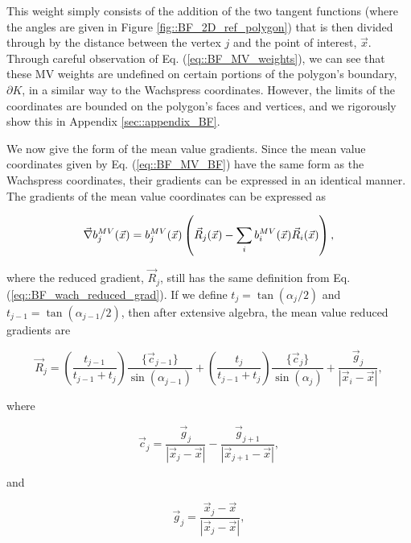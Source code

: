 \noindent This weight simply consists of the addition of the two tangent functions (where the angles are given in Figure \ref{fig::BF_2D_ref_polygon}) that is then divided through by the distance between the vertex $j$ and the point of interest, $\vec{x}$. Through careful observation of Eq. (\ref{eq::BF_MV_weights}), we can see that these MV weights are undefined on certain portions of the polygon's boundary, $\partial K$, in a similar way to the Wachspress coordinates. However, the limits of the coordinates are bounded on the polygon's faces and vertices, and we rigorously show this in Appendix \ref{sec::appendix_BF}.

We now give the form of the mean value gradients. Since the mean value coordinates given by Eq. (\ref{eq::BF_MV_BF}) have the same form as the Wachspress coordinates, their gradients can be expressed in an identical manner. The gradients of the mean value coordinates can be expressed as

\begin{equation}
\label{eq::BF_mv_gradient}
\vec{\nabla} b_{j}^{MV}(\vec{x}) = b_{j}^{MV} (\vec{x}) \left( \vec{R}_j  (\vec{x})- \sum\displaylimits_{i}   b_{i}^{MV} (\vec{x}) \vec{R}_i (\vec{x}) \right) ,
\end{equation}

\noindent where the reduced gradient, $\vec{R}_j $, still has the same definition from Eq. (\ref{eq::BF_wach_reduced_grad}). If we define $t_j=\tan(\alpha_j/2)$ and $t_{j-1}=\tan(\alpha_{j-1}/2)$, then after extensive algebra, the mean value reduced gradients are

\begin{equation}
\label{eq::BF_mv_red_grad_form}
\vec{R}_j  = \left( \frac{t_{j-1}}{t_{j-1} + t_{j}} \right) \frac{\{  \vec{c}_{j-1} \}}{\sin (  \alpha_{j-1} )} +  \left( \frac{t_{j}}{t_{j-1} + t_{j}} \right) \frac{\{  \vec{c}_{j} \}}{\sin (  \alpha_{j} )}+ \frac{\vec{g}_j}{|\vec{x}_i - \vec{x}|},
\end{equation}

\noindent where

\begin{equation}
\label{eq::BF_mv_red_cval}
\vec{c}_j = \frac{\vec{g}_{j}}{|\vec{x}_j - \vec{x}|} - \frac{\vec{g}_{j+1}}{|\vec{x}_{j+1} - \vec{x}|},
\end{equation}

\noindent and

\begin{equation}
\label{eq::BF_mv_red_gval}
\vec{g}_j = \frac{\vec{x}_j - \vec{x}}{|\vec{x}_j - \vec{x}|},
\end{equation}

